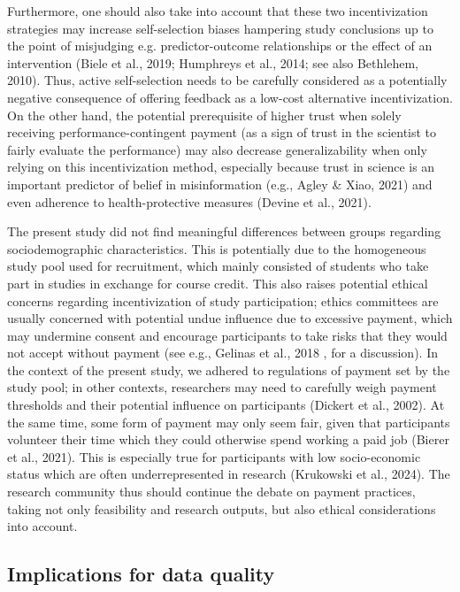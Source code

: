 \documentclass[authordate, empirical,issue]{jote-new-article}
\begin{document}
Furthermore, one should also take into account that these two incentivization strategies may increase self-selection biases hampering study conclusions up to the point of misjudging e.g. predictor-outcome relationships or the effect of an intervention (Biele et al., 2019; Humphreys et al., 2014; see also Bethlehem, 2010). Thus, active self-selection needs to be carefully considered as a potentially negative consequence of offering feedback as a low-cost alternative incentivization. On the other hand, the potential prerequisite of higher trust when solely receiving performance-contingent payment (as a sign of trust in the scientist to fairly evaluate the performance) may also decrease generalizability when only relying on this incentivization method, especially because trust in science is an important predictor of belief in misinformation (e.g., Agley \& Xiao, 2021) and even adherence to health-protective measures (Devine et al., 2021).



The present study did not find meaningful differences between groups regarding sociodemographic characteristics. This is potentially due to the homogeneous study pool used for recruitment, which mainly consisted of students who take part in studies in exchange for course credit. This also raises potential ethical concerns regarding incentivization of study participation; ethics committees are usually concerned with potential undue influence due to excessive payment, which may undermine consent and encourage participants to take risks that they would not accept without payment (see e.g., Gelinas et al., 2018 , for a discussion). In the context of the present study, we adhered to regulations of payment set by the study pool; in other contexts, researchers may need to carefully weigh payment thresholds and their potential influence on participants (Dickert et al., 2002). At the same time, some form of payment may only seem fair, given that participants volunteer their time which they could otherwise spend working a paid job (Bierer et al., 2021). This is especially true for participants with low socio-economic status which are often underrepresented in research (Krukowski et al., 2024). The research community thus should continue the debate on payment practices, taking not only feasibility and research outputs, but also ethical considerations into account.



\subsection{Implications for data quality}
\end{document}
